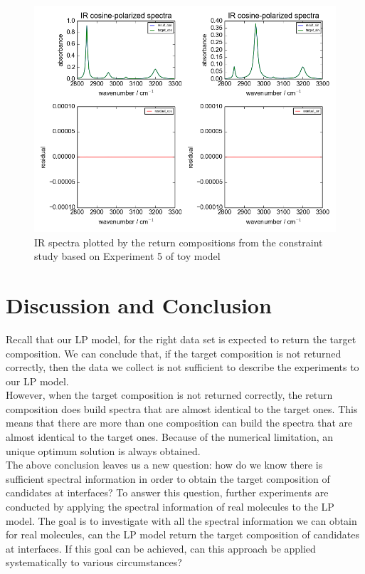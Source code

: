 \begin{figure}[!ht] 
\centering
\includegraphics[scale=0.7]{Figures/toy_model_result_plotting_ir_sin_10candi_constraint_study_experiment5.png} 
\caption{IR spectra plotted by the return compositions from the constraint study based on Experiment 5 of toy model}\label{fig:3.6}
\end{figure}

\section{Discussion and Conclusion}

Recall that our LP model, for the right data set is expected to return the target composition. We can conclude that, if the target composition is not returned correctly, then the data we collect is not sufficient to describe the experiments to our LP model. \\

However, when the target composition is not returned correctly, the return composition does build spectra that are almost identical to the target ones. This means that there are more than one composition can build the spectra that are almost identical to the target ones. Because of the numerical limitation, an unique optimum solution is always obtained. \\

The above conclusion leaves us a new question: how do we know there is sufficient spectral information in order to obtain the target composition of candidates at interfaces? To answer this question, further experiments are conducted by applying the spectral information of real molecules to the LP model. The goal is to investigate with all the spectral information we can obtain for real molecules, can the LP model return the target composition of candidates at interfaces. If this goal can be achieved, can this approach be applied systematically to various circumstances?

